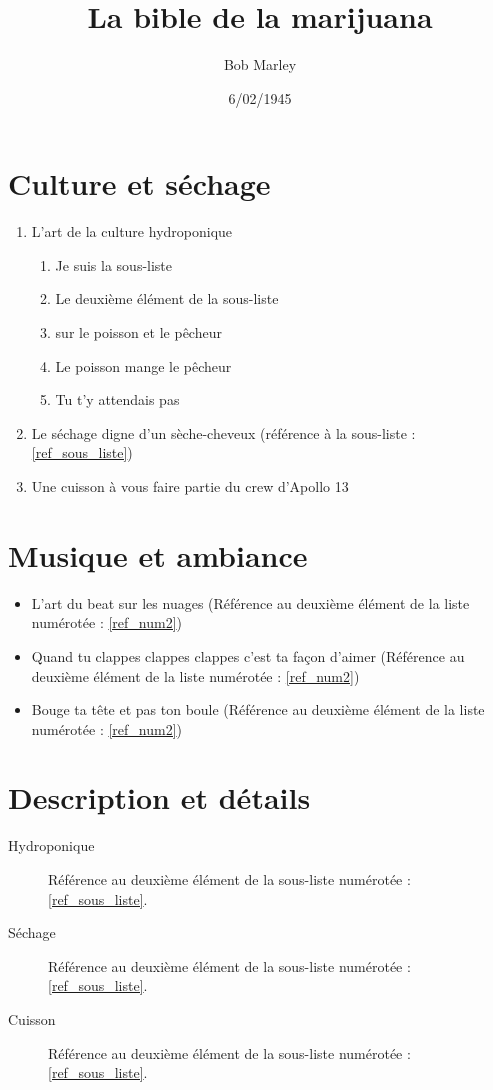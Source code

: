 \documentclass{article}
\title{La bible de la marijuana}
\author{Bob Marley}
\date{6/02/1945}
\begin{document}
\maketitle
\newpage
\tableofcontents
\newpage

\section{Culture et séchage}
\begin{enumerate}
    \item L'art de la culture hydroponique
    \begin{enumerate}
        \item Je suis la sous-liste
        \item \label{ref_sous_liste} Le deuxième élément de la sous-liste
        \item sur le poisson et le pêcheur
        \item Le poisson mange le pêcheur
        \item Tu t'y attendais pas
    \end{enumerate}                                                          
    \item \label{ref_num2} Le séchage digne d'un sèche-cheveux (référence à la sous-liste : \ref{ref_sous_liste})
    \item Une cuisson à vous faire partie du crew d'Apollo 13
\end{enumerate}

\section{Musique et ambiance}
\begin{itemize}
    \item L'art du beat sur les nuages (Référence au deuxième élément de la liste numérotée : \ref{ref_num2})
    \item Quand tu clappes clappes clappes c'est ta façon d'aimer (Référence au deuxième élément de la liste numérotée : \ref{ref_num2})
    \item Bouge ta tête et pas ton boule (Référence au deuxième élément de la liste numérotée : \ref{ref_num2})
\end{itemize}

\section{Description et détails}
\begin{description}
	\item[Hydroponique] Référence au deuxième élément de la sous-liste numérotée : \ref{ref_sous_liste}.
    \item[Séchage] Référence au deuxième élément de la sous-liste numérotée : \ref{ref_sous_liste}.
    \item[Cuisson] Référence au deuxième élément de la sous-liste numérotée : \ref{ref_sous_liste}.
\end{description}
\end{document}
